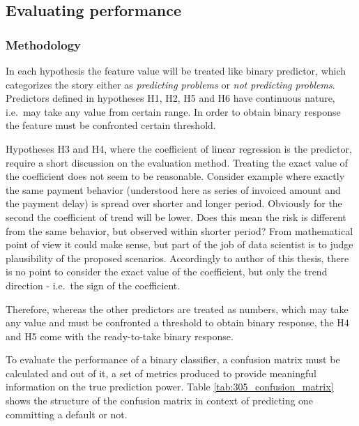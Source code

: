 \documentclass{article}
\begin{document}
\subsection{Evaluating performance}

\subsubsection{Methodology}

In each hypothesis the feature value will be treated like binary predictor,
which categorizes the story either as \textit{predicting problems} or \textit{not predicting problems}.
Predictors defined in hypotheses H1, H2, H5 and H6 have continuous nature, i.e.\ may take any value from certain range.
In order to obtain binary response the feature must be confronted certain threshold.
\par Hypotheses H3 and H4, where the coefficient of linear regression is the predictor, require a short discussion on the evaluation method.
Treating the exact value of the coefficient does not seem to be reasonable.
Consider example where exactly the same payment behavior (understood here as series of invoiced amount and the payment delay) is spread over shorter and longer period.
Obviously for the second the coefficient of trend will be lower.
Does this mean the risk is different from the same behavior, but observed within shorter period?
From mathematical point of view it could make sense, but part of the job of data scientist is to judge plausibility of the proposed scenarios.
Accordingly to author of this thesis, there is no point to consider the exact value of the coefficient, but only the trend direction - i.e.\ the sign of the coefficient.
\par Therefore, whereas the other predictors are treated as numbers, which may take any value and must be confronted a threshold to obtain binary response,
the H4 and H5 come with the ready-to-take binary response.
\par To evaluate the performance of a binary classifier, a confusion matrix must be calculated and
out of it, a set of metrics produced to provide meaningful information on the true prediction power.
Table \ref {tab:305_confusion_matrix} shows the structure of the confusion matrix in context of predicting one committing a default or not.
\end{document}

